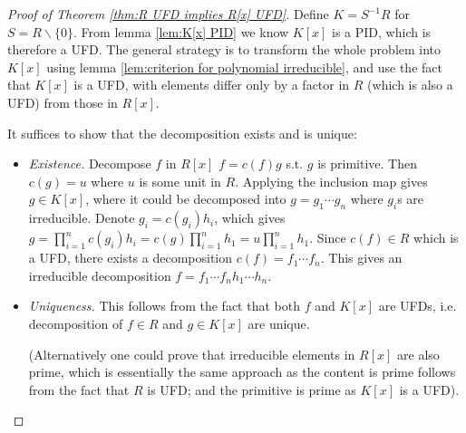 \begin{proof}[Proof of Theorem \ref{thm:R UFD implies R[x] UFD}]
    Define $K = S^{-1}R$ for $S = R \smallsetminus\{0\}$. From lemma \ref{lem:K[x] PID} we know $K[x]$ is a PID, which is therefore a UFD. The general strategy is to transform the whole problem into $K[x]$ using lemma \ref{lem:criterion for polynomial irreducible}, and use the fact that $K[x]$ is a UFD, with elements differ only by a factor in $R$ (which is also a UFD) from those in $R[x]$.

    It suffices to show that the decomposition exists and is unique:
    \begin{itemize}
        \item \emph{Existence.} Decompose $f$ in $R[x]$ $f = c(f) g$ s.t. $g$ is primitive. Then $c(g) = u$ where $u$ is some unit in $R$. Applying the inclusion map gives $g\in K[x]$, where it could be decomposed into $g = g_1\cdots g_n$ where $g_i$s are irreducible. Denote $g_i = c(g_i) h_i$, which gives $g = \prod_{i=1}^n c(g_i) h_i = c(g) \prod_{i=1}^n h_1 = u\prod_{i=1}^n h_1$. Since $c(f) \in R$ which is a UFD, there exists a decomposition $c(f) = f_1\cdots f_n$. This gives an irreducible decomposition $f = f_1\cdots f_n h_1\cdots h_n$.
        \item \emph{Uniqueness.} This follows from the fact that both $f$ and $K[x]$ are UFDs, i.e. decomposition of $f\in R$ and $g\in K[x]$ are unique.
        
        (Alternatively one could prove that irreducible elements in $R[x]$ are also prime, which is essentially the same approach as the content is prime follows from the fact that $R$ is UFD; and the primitive is prime as $K[x]$ is a UFD).
    \end{itemize}
\end{proof}